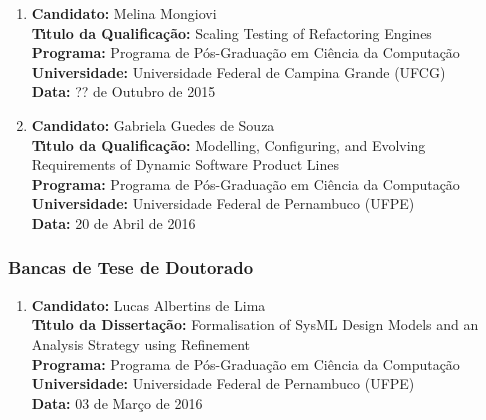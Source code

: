 \documentclass[a4paper,oneside,10pt]{article}
\begin{document}
\begin{enumerate}
\renewcommand{\labelenumi}{{\large\bfseries\arabic{enumi}.}}
\vspace{0.3cm}

\item       \textbf{Candidato:} Melina Mongiovi \mbox{} \\
            \textbf{T\'{\i}tulo da Qualifica\c{c}\~{a}o:} Scaling Testing of Refactoring Engines\\
            \textbf{Programa:} Programa de Pós-Graduação em Ciência da Computação\\
            \textbf{Universidade:} Universidade Federal de Campina Grande (UFCG)\\
            \textbf{Data:} ?? de Outubro de 2015

\item       \textbf{Candidato:} Gabriela Guedes de Souza \mbox{} \\
            \textbf{T\'{\i}tulo da Qualifica\c{c}\~{a}o:} Modelling, Configuring, and Evolving Requirements of Dynamic Software Product Lines\\
            \textbf{Programa:} Programa de Pós-Graduação em Ciência da Computação\\
            \textbf{Universidade:} Universidade Federal de Pernambuco (UFPE)\\
            \textbf{Data:} 20 de Abril de 2016

\end{enumerate}


\subsubsection{Bancas de Tese de Doutorado}

\begin{enumerate}
\renewcommand{\labelenumi}{{\large\bfseries\arabic{enumi}.}}
\vspace{0.3cm}

\item       \textbf{Candidato:} Lucas Albertins de Lima \mbox{} \\
            \textbf{T\'{\i}tulo da Disserta\c{c}\~{a}o:} Formalisation of SysML Design Models and an Analysis Strategy using Refinement\\
            \textbf{Programa:} Programa de Pós-Graduação em Ciência da Computação\\
            \textbf{Universidade:} Universidade Federal de Pernambuco (UFPE)\\
            \textbf{Data:} 03 de Março de 2016

\end{enumerate}
\end{document}
